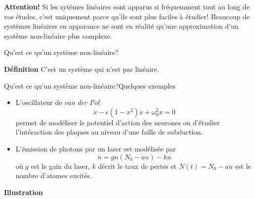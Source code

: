 \documentclass[usenames,dvipsnames,svgnames,10pt,aspectratio=169]{beamer}
\begin{document}
\begin{frame}[t, c]{}{}
	\begin{block}{\centering \textbf{Attention!}}
		Si les sytèmes linéaires sont apparus si fréquemment tout au long de vos études, c'est uniquement parce qu'ils sont plus faciles à étudier! Beaucoup de systèmes linéaires en apparance ne sont en réalité qu'une approximation d'un système non-linéaire plus complexe.
	\end{block}
\end{frame}

\begin{frame}[t, c]{Qu'est ce qu'un système non-linéaire?}{}
	\begin{block}{\centering \textbf{Définition}}
		\centering
		C'est un système qui n'est pas linéaire.
	\end{block}

	\vspace{1cm}
\end{frame}

\begin{frame}[t, c]{Qu'est ce qu'un système non-linéaire?}{Quelques exemples}
	\begin{itemize}
		\item L'oscillateur de \emph{van der Pol}
		$$\ddot{x} - \epsilon (1 - x^2) \dot{x} + \omega_0^2 x = 0$$
		permet de modéliser le potentiel d'action des neurones ou d'étudier l'intéraction des plaques au niveau d'une faille de subduction.

		\medskip

		\item L'émission de photons par un laser est modélisée par
		$$\dot{n} = gn ( N_0 - an) - kn$$
		où $g$ est le gain du laser, $k$ décrit le taux de pertes et $N(t) = N_0 - an$ est le nombre d'atomes excités.

	\end{itemize}

	\vspace{1cm}
\end{frame}

\begin{frame}[t, c]{}{}

	\centering

	{\Large \textbf{Illustration}}

	\bigskip


	\vspace{-2cm}
\end{frame}
\end{document}
